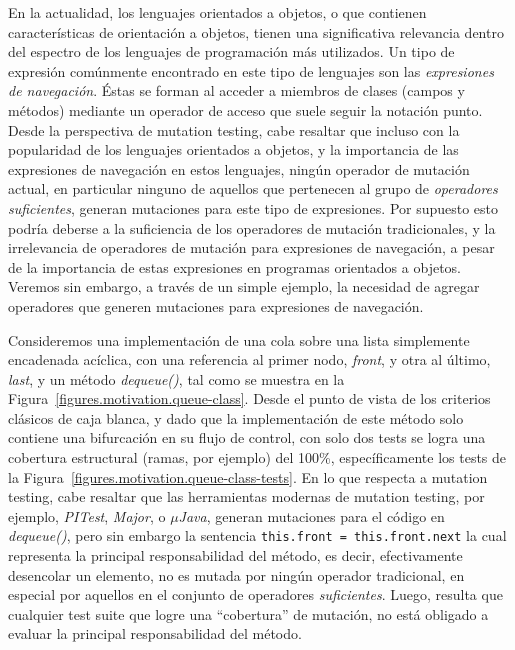 En la actualidad, los lenguajes orientados a objetos, o que contienen caracter\'isticas de orientaci\'on a objetos, tienen una significativa relevancia dentro del espectro de los lenguajes de programaci\'on m\'as utilizados. Un tipo de expresi\'on com\'unmente encontrado en este tipo de lenguajes son las \emph{expresiones de navegaci\'on}. \'Estas se forman al acceder a miembros de clases (campos y m\'etodos) mediante un operador de acceso que suele seguir la notaci\'on punto. Desde la perspectiva de mutation testing, cabe resaltar que incluso con la popularidad de los lenguajes orientados a objetos, y la importancia de las expresiones de navegaci\'on en estos lenguajes, ning\'un operador de mutaci\'on actual, en particular ninguno de aquellos que pertenecen al grupo de \emph{operadores suficientes}, generan mutaciones para este tipo de expresiones. Por supuesto esto podr\'ia deberse a la suficiencia de los operadores de mutaci\'on tradicionales, y la irrelevancia de operadores de mutaci\'on para expresiones de navegaci\'on, a pesar de la importancia de estas expresiones en programas orientados a objetos. Veremos sin embargo, a trav\'es de un simple ejemplo, la necesidad de agregar operadores que generen mutaciones para expresiones de navegaci\'on.

Consideremos una implementaci\'on de una cola sobre una lista simplemente encadenada ac\'iclica, con una referencia al primer nodo, \emph{front}, y otra al \'ultimo, \emph{last}, y un m\'etodo \emph{dequeue()}, tal como se muestra en la Figura~\ref{figures.motivation.queue-class}. Desde el punto de vista de los criterios cl\'asicos de caja blanca, y dado que la implementaci\'on de este m\'etodo solo contiene una bifurcaci\'on en su flujo de control, con solo dos tests se logra una cobertura estructural (ramas, por ejemplo) del 100\%, espec\'ificamente los tests de la Figura~\ref{figures.motivation.queue-class-tests}. En lo que respecta a mutation testing, cabe resaltar que las herramientas modernas de mutation testing, por ejemplo, \emph{PITest}, \emph{Major}, o \emph{$\mu$Java}, generan mutaciones para el c\'odigo en \emph{dequeue()}, pero sin embargo la sentencia \texttt{this.front = this.front.next} la cual representa la principal responsabilidad del m\'etodo, es decir, efectivamente desencolar un elemento, no es mutada por ning\'un operador tradicional, en especial por aquellos en el conjunto de operadores \emph{suficientes}. Luego, resulta que cualquier test suite que logre una ``cobertura'' de mutaci\'on, no est\'a obligado a evaluar la principal responsabilidad del m\'etodo.

